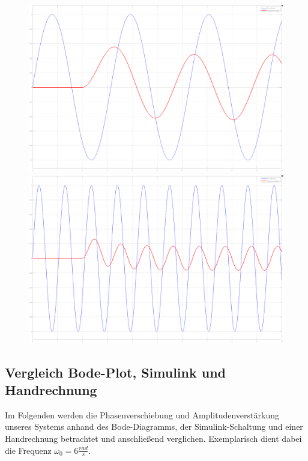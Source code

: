  \begin{figure}[H]
    \centering
    \begin{minipage}{.5\textwidth}
      \centering
      \includegraphics[width=0.9\linewidth]{Bilder/SimulinkOmega2.png}
    \end{minipage}%
    \begin{minipage}{.5\textwidth}
      \centering
      \includegraphics[width=0.9\linewidth]{Bilder/SimulinkOmega6.png}
    \end{minipage}
\end{figure}

\subsection{Vergleich Bode-Plot, Simulink und Handrechnung}
Im Folgenden werden die Phasenverschiebung und Amplitudenverstärkung unseres Systems anhand des Bode-Diagramms, der Simulink-Schaltung und einer Handrechnung betrachtet und anschließend verglichen. Exemplarisch dient dabei die Frequenz $\omega_0 = 6 \frac{rad}{s}$.

